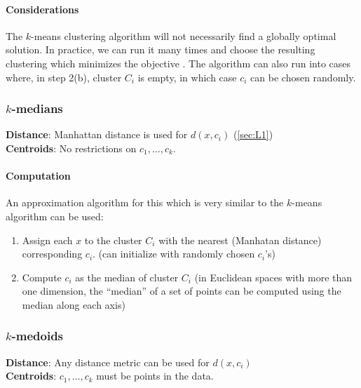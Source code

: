 \documentclass[12pt,a4paper]{article}
\newcommand{\1}[1]{\mathds{1}\left[#1\right]}
\begin{document}
\paragraph{Considerations} The $k$-means clustering algorithm will not necessarily find a globally optimal solution. In practice, we can run it many times and choose the resulting clustering which minimizes the objective \cite{ciml}. The algorithm can also run into cases where, in step 2(b), cluster $C_i$ is empty, in which case $c_i$ can be chosen randomly.


\subsubsection{\texorpdfstring{$k$}{k}-medians}\label{sec:kmedians}
\textbf{Distance}: Manhattan distance is used for $d(x,c_i)$ (\ref{sec:L1}) \\
\textbf{Centroids}: No restrictions on $c_1,\ldots,c_k$.

\paragraph{Computation}
An approximation algorithm for this which is very similar to the $k$-means algorithm can be used:
\begin{enumerate}
    \item Assign each $x$ to the cluster $C_i$ with the nearest (Manhatan distance) corresponding $c_i$. (can initialize with randomly chosen $c_i$'s)
    \item Compute $c_i$ as the median of cluster $C_i$ (in Euclidean spaces with more than one dimension, the ``median'' of a set of points can be computed using the median along each axis)
\end{enumerate}

\subsubsection{\texorpdfstring{$k$}{k}-medoids}\label{sec:kmedoids}
\textbf{Distance}: Any distance metric can be used for $d(x,c_i)$ \\
\textbf{Centroids}: $c_1,\ldots,c_k$ must be points in the data.
\end{document}
